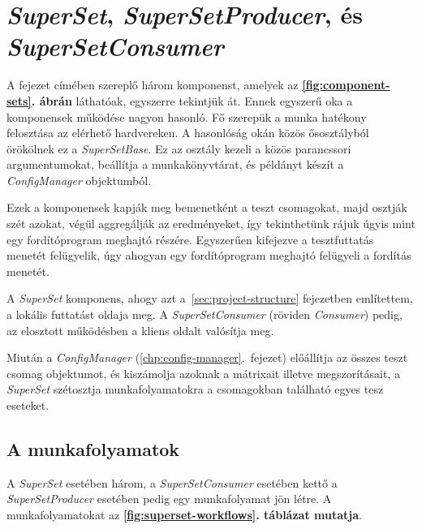 \section{\textit{SuperSet}, \textit{SuperSetProducer}, és \textit{SuperSetConsumer}}

    A fejezet címében szereplő három komponenst, amelyek az \textbf{\ref{fig:component-sets}. ábrán} láthatóak,
    egyszerre tekintjük át. Ennek egyszerű oka a komponensek működése nagyon hasonló. Fő szerepük a munka hatékony
    felosztása az elérhető hardvereken. A hasonlóság okán közös ősosztályból örökölnek ez a \textit{SuperSetBase}. Ez
    az osztály kezeli a közös parancssori argumentumokat, beállítja a munkakönyvtárat, és példányt készít a
    \textit{ConfigManager} objektumból.

    Ezek a komponensek kapják meg bemenetként a teszt csomagokat, majd osztják szét azokat, végül aggregálják az
    eredményeket, így tekinthetünk rájuk úgyis mint egy fordítóprogram meghajtó részére. Egyszerűen kifejezve a
    tesztfuttatás menetét felügyelik, úgy ahogyan egy fordítóprogram meghajtó felügyeli a fordítás menetét.

    A \textit{SuperSet} komponens, ahogy azt a~\ref{sec:project-structure} fejezetben említettem, a lokális futtatást
    oldaja meg. A \textit{SuperSetConsumer} (röviden \textit{Consumer}) pedig, az elosztott működésben a kliens oldalt
    valósítja meg.

    Miután a \textit{ConfigManager} (\ref{chp:config-manager}.\ fejezet) előállítja az összes teszt csomag objektumot,
    és kiszámolja azoknak a mátrixait illetve megszorításait, a \textit{SuperSet} szétosztja munkafolyamatokra a
    csomagokban található egyes tesz eseteket.

    \subsection{A munkafolyamatok}

        A \textit{SuperSet} esetében három, a \textit{SuperSetConsumer} esetében kettő a \textit{SuperSetProducer}
        esetében pedig egy munkafolyamat jön létre. A munkafolyamatokat az \textbf{\ref{fig:superset-workflows}.
        táblázat mutatja}.

